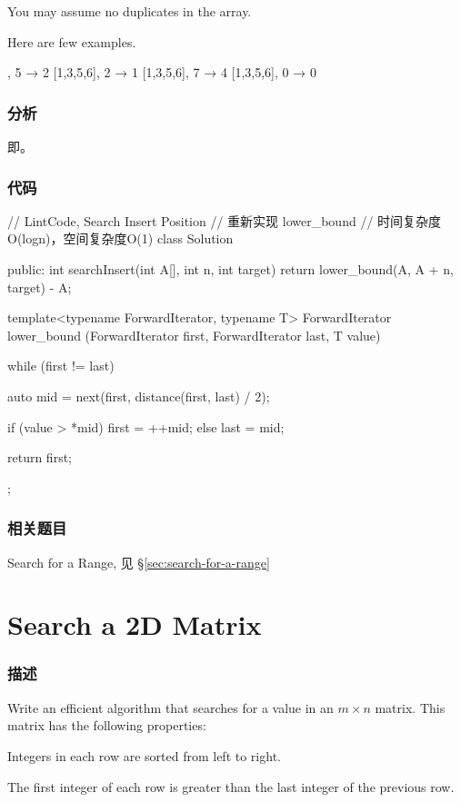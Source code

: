You may assume no duplicates in the array.

Here are few examples.
\begin{Code}
[1,3,5,6], 5 → 2
[1,3,5,6], 2 → 1
[1,3,5,6], 7 → 4
[1,3,5,6], 0 → 0
\end{Code}


\subsubsection{分析}
即。


\subsubsection{代码}
\begin{Code}
// LintCode, Search Insert Position
// 重新实现 lower_bound
// 时间复杂度O(logn)，空间复杂度O(1)
class Solution {
public:
    int searchInsert(int A[], int n, int target) {
        return lower_bound(A, A + n, target) - A;
    }

    template<typename ForwardIterator, typename T>
    ForwardIterator lower_bound (ForwardIterator first,
            ForwardIterator last, T value) {
        while (first != last) {
            auto mid = next(first, distance(first, last) / 2);

            if (value > *mid)   first = ++mid;
            else                last = mid;
        }

        return first;
    }
};
\end{Code}


\subsubsection{相关题目}
\begindot
\item Search for a Range, 见 \S \ref{sec:search-for-a-range}
\myenddot


\section{Search a 2D Matrix} %
\label{sec:search-a-2d-matrix}


\subsubsection{描述}
Write an efficient algorithm that searches for a value in an $m \times n$ matrix. This matrix has the following properties:
\begindot
\item Integers in each row are sorted from left to right.
\item The first integer of each row is greater than the last integer of the previous row.
\myenddot

